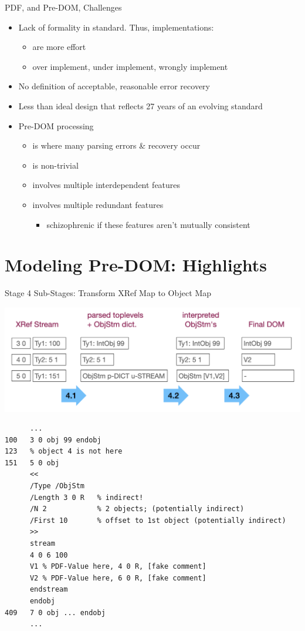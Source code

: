 \documentclass[t,10pt,xcolor={dvipsnames}]{beamer}
\begin{document}
\begin{frame}[label={sec:org740ec19}]{PDF, and Pre-DOM, Challenges}
\begin{itemize}
\item Lack of formality in standard. Thus, implementations:
\begin{itemize}
\item are more effort
\item over implement, under implement, wrongly implement
\end{itemize}
\item No definition of acceptable, reasonable error recovery
\item Less than ideal design that reflects 27 years of an evolving standard
\item Pre-DOM processing
\begin{itemize}
\item is where many parsing errors \& recovery occur
\item is non-trivial
\item involves multiple interdependent features
\item involves multiple redundant features
\begin{itemize}
\item schizophrenic if these features aren't mutually consistent
\end{itemize}
\end{itemize}
\end{itemize}
\end{frame}

\section{Modeling Pre-DOM: Highlights}
\label{sec:org0f0d6bd}
\begin{frame}[label={sec:orga75f20a},fragile]{Stage 4 Sub-Stages: Transform XRef Map to Object Map}
 \begin{center}
\includegraphics[width=0.8\linewidth]{images/diagram1/cropped-diagram1.001.png}
\end{center}
\begin{verbatim}
      ...
100   3 0 obj 99 endobj
123   % object 4 is not here
151   5 0 obj
      <<
      /Type /ObjStm
      /Length 3 0 R   % indirect!
      /N 2            % 2 objects; (potentially indirect)
      /First 10       % offset to 1st object (potentially indirect)
      >>
      stream
      4 0 6 100
      V1 % PDF-Value here, 4 0 R, [fake comment] 
      V2 % PDF-Value here, 6 0 R, [fake comment]
      endstream
      endobj
409   7 0 obj ... endobj
      ...
\end{verbatim}
\end{frame}
\end{document}

